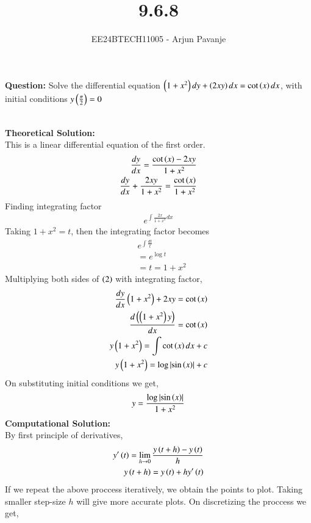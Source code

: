 \documentclass[journal]{IEEEtran}
\begin{document}

\vspace{3cm}

\title{9.6.8}
\author{EE24BTECH11005 - Arjun Pavanje}
{\let\newpage\relax\maketitle}
\textbf{Question:}
Solve the differential equation $\left(1+x^2\right)dy+\left(2xy\right) dx = \cot\left(x\right)dx$, with initial conditions $y\left(\frac{\pi}{2}\right)=0$

\solution\\
\textbf{Theoretical Solution:}\\
This is a linear differential equation of the first order.
\begin{align}
  \frac{dy}{dx}= \frac{\cot\left(x\right)-2xy}{1+x^2}\\
  \frac{dy}{dx} + \frac{2xy}{1+x^2} = \frac{\cot\left(x\right)}{1+x^2}
\end{align}
Finding integrating factor 
\begin{align}
  e^{\int \frac{2x}{1+x^2}dx}
\end{align}
Taking $1+x^2=t$, then the integrating factor becomes
\begin{align}
  &e^{\int \frac{dt}{t}}\\
  &=e^{\log{t}}\\
  &=t=1+x^2
\end{align}
Multiplying both sides of $\left(2\right)$ with integrating factor,
\begin{align}
  \frac{dy}{dx}\left(1+x^2\right) + 2xy = \cot\left(x\right)\\
  \frac{d\left(\left(1+x^2\right)y\right)}{dx}=\cot\left(x\right)\\
  y\left(1+x^2\right)=\int \cot\left(x\right)dx + c\\
  y\left(1+x^2\right)= \log{\left\vert\sin\ensuremath{\left(x\right)}\right\vert} + c
\end{align}
On substituting initial conditions we get,
\begin{align}
  y=\frac{\log\left\vert\sin\left(x\right)\right\vert}{1+x^2}
\end{align}
\textbf{Computational Solution:}\\
By first principle of derivatives,
\begin{align}
    y^{\prime}\left(t\right) = \lim_{h\to 0}\frac{y\left(t+h\right) - y\left(t\right)}{h}\\
    y\left(t+h\right) = y\left(t\right) + hy^{\prime}\left(t\right)
\end{align}
If we repeat the above proccess iteratively, we obtain the points to plot. Taking smaller step-size $h$ will give more accurate plots. On discretizing the proccess we get,
\end{document}
